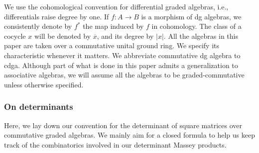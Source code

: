 \documentclass[11pt]{article}
\theoremstyle{definition}
\theoremstyle{definition}
\begin{document}
We use the cohomological convention for differential graded algebras, i.e., differentials raise degree by one.
If $f:A\to B$ is a morphism of dg algebras, we consistently denote by $f^*$ the map induced by $f$ in cohomology.
The class of a cocycle $x$ will be denoted by $\overline{x}$, and its degree by $|x|$.
All the algebras in this paper are taken over a commutative unital ground ring.
We specify its characteristic whenever it matters. We abbreviate commutative dg algebra to cdga.
Although part of what is done in this paper admits a generalization to associative algebras,
we will assume all the algebras to be graded-commutative unless otherwise specified.




\subsubsection*{On determinants}


Here, we lay down our convention for the determinant of square matrices 
over commutative graded algebras.  
We mainly aim for a closed formula to help us keep track of the combinatorics involved in our determinant Massey products.

\smallskip
\end{document}

